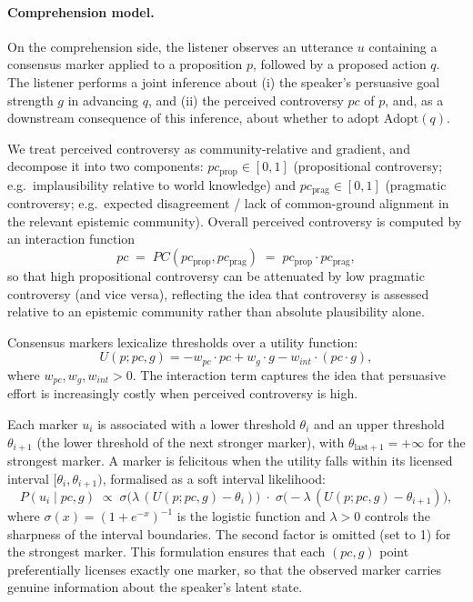 \documentclass[12pt]{article}
\begin{document}
\paragraph{Comprehension model.}

On the comprehension side, the listener observes an utterance $u$ containing a consensus marker applied to a proposition $p$, followed by a proposed action $q$. The listener performs a joint inference about (i) the speaker's persuasive goal strength $g$ in advancing $q$, and (ii) the perceived controversy $pc$ of $p$, and, as a downstream consequence of this inference, about whether to adopt $\mathrm{Adopt}(q)$.

We treat perceived controversy as community-relative and gradient, and decompose it into two components:
$pc_{\text{prop}} \in [0,1]$ (propositional controversy; e.g.\ implausibility relative to world knowledge) and
$pc_{\text{prag}} \in [0,1]$ (pragmatic controversy; e.g.\ expected disagreement / lack of common-ground alignment in the relevant epistemic community).
Overall perceived controversy is computed by an interaction function
\begin{equation}
pc \;=\; PC(pc_{\text{prop}}, pc_{\text{prag}})
\;=\;
pc_{\text{prop}} \cdot pc_{\text{prag}},
\end{equation}
so that high propositional controversy can be attenuated by low pragmatic controversy (and vice versa), reflecting the idea that controversy is assessed relative to an epistemic community rather than absolute plausibility alone.

Consensus markers lexicalize thresholds over a utility function:
\begin{equation}
U(p; pc, g)
=
- w_{pc} \cdot pc
+
w_g \cdot g
-
w_{int} \cdot (pc \cdot g),
\end{equation}
where $w_{pc}, w_g, w_{int} > 0$. The interaction term captures the idea that persuasive effort is increasingly costly when perceived controversy is high.

Each marker $u_i$ is associated with a lower threshold $\theta_i$ and an upper threshold $\theta_{i+1}$ (the lower threshold of the next stronger marker), with $\theta_{\text{last}+1} = +\infty$ for the strongest marker. A marker is felicitous when the utility falls within its licensed interval $[\theta_i, \theta_{i+1})$, formalised as a soft interval likelihood:
\begin{equation}
P(u_i \mid pc, g)
\;\propto\;
\sigma\!\bigl(\lambda\,(U(p; pc, g) - \theta_i)\bigr)
\;\cdot\;
\sigma\!\bigl(-\lambda\,(U(p; pc, g) - \theta_{i+1})\bigr),
\label{eq:likelihood}
\end{equation}
where $\sigma(x) = (1 + e^{-x})^{-1}$ is the logistic function and $\lambda > 0$ controls the sharpness of the interval boundaries. The second factor is omitted (set to 1) for the strongest marker. This formulation ensures that each $(pc, g)$ point preferentially licenses exactly one marker, so that the observed marker carries genuine information about the speaker's latent state.
\end{document}
